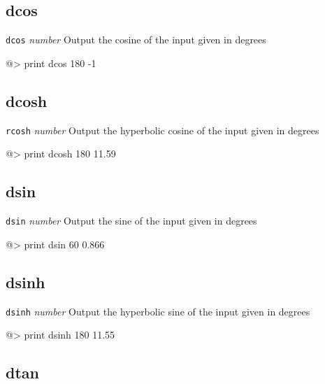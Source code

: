 \subsection*{dcos}  
 
{\tt dcos} {\it number} 
\newline\newline 
Output the cosine of the input given in degrees 
\begin{verbatimtab} 
@> print dcos 180 
-1
\end{verbatimtab} 

\subsection*{dcosh}  
 
{\tt rcosh} {\it number} 
\newline\newline 
Output the hyperbolic cosine of the input given in degrees 
\begin{verbatimtab} 
@> print dcosh 180
11.59
\end{verbatimtab}

\subsection*{dsin}  
 
{\tt dsin} {\it number} 
\newline\newline 
Output the sine of the input given in degrees 
\begin{verbatimtab} 
@> print dsin 60 
0.866
\end{verbatimtab}

\subsection*{dsinh}  
 
{\tt dsinh} {\it number} 
\newline\newline 
Output the hyperbolic sine of the input given in degrees 
\begin{verbatimtab} 
@> print dsinh 180
11.55
\end{verbatimtab}

\subsection*{dtan}  
 
